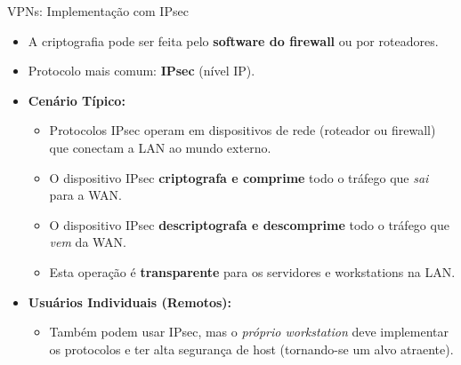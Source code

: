 \begin{frame}{VPNs: Implementação com IPsec}
    \begin{itemize}
        \item A criptografia pode ser feita pelo \textbf{software do firewall} ou por roteadores.
        \item Protocolo mais comum: \textbf{IPsec} (nível IP).

        \item \textbf{Cenário Típico:}
              \begin{itemize}
                  \item Protocolos IPsec operam em dispositivos de rede (roteador ou firewall) que conectam a LAN ao mundo externo.
                  \item O dispositivo IPsec \textbf{criptografa e comprime} todo o tráfego que \textit{sai} para a WAN.
                  \item O dispositivo IPsec \textbf{descriptografa e descomprime} todo o tráfego que \textit{vem} da WAN.
                  \item Esta operação é \textbf{transparente} para os servidores e workstations na LAN.
              \end{itemize}

        \item \textbf{Usuários Individuais (Remotos):}
              \begin{itemize}
                  \item Também podem usar IPsec, mas o \textit{próprio workstation} deve implementar os protocolos e ter alta segurança de host (tornando-se um alvo atraente).
              \end{itemize}
    \end{itemize}
\end{frame}

